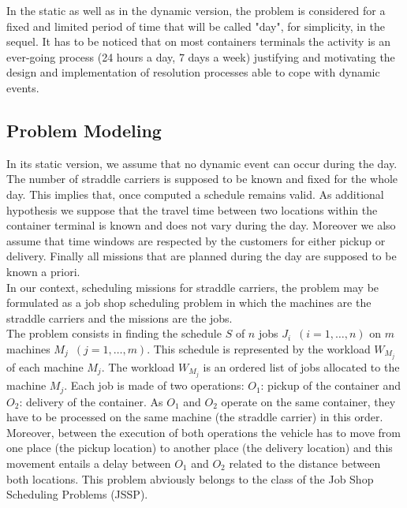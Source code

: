 \documentclass[a4paper,12pt]{article}
\begin{document}

In the static as well as in the dynamic version, the problem is considered for a fixed and limited period of time that will be called "day", for simplicity, in the sequel. It has to be noticed that on most containers terminals the activity is an ever-going process (24 hours a day, 7 days a week) justifying and motivating the design and implementation of resolution processes able to cope with dynamic events. 

\subsection{Problem Modeling}

In its static version, we assume that no dynamic event can occur during the day. The number of straddle carriers is supposed to be known and fixed for the whole day. This implies that, once computed a schedule remains valid. As additional hypothesis we suppose that the travel time between two locations within the container terminal is known and does not vary during the day. Moreover we also assume that time windows are respected by the customers for either pickup or delivery. Finally all missions that are planned during the day are supposed to be known a priori. \\


In our context, scheduling missions for straddle carriers, the problem may be formulated as a job shop scheduling problem in which the machines are the straddle carriers and the missions are the jobs. \\

The problem consists in finding the schedule $S$ of $n$ jobs $J_i$~$(i=1,\ldots,n)$ on $m$ machines $M_j$~$(j=1,\ldots,m)$. This schedule is represented by the workload $W_{M_j}$ of each machine $M_j$. The workload $W_{M_j}$ is an ordered list of jobs allocated to the machine $M_j$. Each job is made of two operations: $O_1$: pickup of the container and $O_2$: delivery of the container. As $O_1$ and $O_2$ operate on the same container, they have to be processed on the same machine (the straddle carrier) in this order. Moreover, between the execution of both operations the vehicle has to move from one place (the pickup location) to another place (the delivery location) and this movement entails a delay between $O_1$ and $O_2$ related to the distance between both locations. This problem abviously belongs to the class of the Job Shop Scheduling Problems (JSSP).
\end{document}
